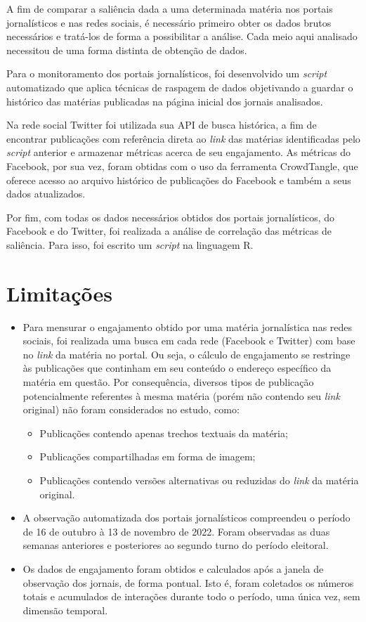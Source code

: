 \documentclass[
	12pt,
	oneside,
	a4paper,
	english,
	brazil
]{abntex2ppgsi}
\begin{document}
A fim de comparar a saliência dada a uma determinada matéria nos portais jornalísticos e nas redes sociais, é necessário primeiro obter os dados brutos necessários e tratá-los de forma a possibilitar a análise. Cada meio aqui analisado necessitou de uma forma distinta de obtenção de dados.

Para o monitoramento dos portais jornalísticos, foi desenvolvido um \textit{script} automatizado que aplica técnicas de raspagem de dados objetivando a guardar o histórico das matérias publicadas na página inicial dos jornais analisados.

Na rede social Twitter foi utilizada sua API de busca histórica, a fim de encontrar publicações com referência direta ao \textit{link} das matérias identificadas pelo \textit{script} anterior e armazenar métricas acerca de seu engajamento. As métricas do Facebook, por sua vez, foram obtidas com o uso da ferramenta CrowdTangle, que oferece acesso ao arquivo histórico de publicações do Facebook e também a seus dados atualizados.

Por fim, com todas os dados necessários obtidos dos portais jornalísticos, do Facebook e do Twitter, foi realizada a análise de correlação das métricas de saliência. Para isso, foi escrito um \textit{script} na linguagem R.


\section{Limitações}
\begin{itemize}
    \item Para mensurar o engajamento obtido por uma matéria jornalística nas redes sociais, foi realizada uma busca em cada rede (Facebook e Twitter) com base no \textit{link} da matéria no portal. Ou seja, o cálculo de engajamento se restringe às publicações que continham em seu conteúdo o endereço específico da matéria em questão. Por consequência, diversos tipos de publicação potencialmente referentes à mesma matéria (porém não contendo seu \textit{link} original) não foram considerados no estudo, como:
    \begin{itemize}
        \item Publicações contendo apenas trechos textuais da matéria;
        \item Publicações compartilhadas em forma de imagem;
        \item Publicações contendo versões alternativas ou reduzidas do \textit{link} da matéria original.
    \end{itemize}
    \item A observação automatizada dos portais jornalísticos compreendeu o período de 16 de outubro à 13 de novembro de 2022. Foram observadas as duas semanas anteriores e posteriores ao segundo turno do período eleitoral.
    \item Os dados de engajamento foram obtidos e calculados após a janela de observação dos jornais, de forma pontual. Isto é, foram coletados os números totais e acumulados de interações durante todo o período, uma única vez, sem dimensão temporal.
\end{itemize}
\end{document}
